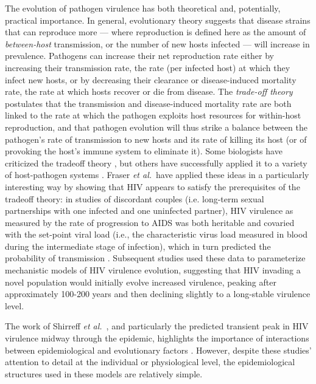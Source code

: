 \documentclass[10pt,letterpaper]{article}
\newcommand{\etal}{\textit{et al.}}
\begin{document}
The evolution of pathogen virulence has both 
theoretical and, potentially, practical
importance. In general, evolutionary theory suggests that
disease strains that can reproduce more --- where reproduction
is defined here as the amount of \emph{between-host} transmission, or
the number of new hosts infected --- will increase in prevalence.
Pathogens can increase their net reproduction rate either
by increasing their transmission rate, 
the rate (per infected host) at which they
infect new hosts, or by decreasing their clearance or disease-induced
mortality rate, the rate
at which hosts recover or die from disease.
The \emph{trade-off theory} \cite{alizon_virulence_2009} postulates that
the transmission and disease-induced mortality rate are both linked to the rate at which
the pathogen exploits host resources for within-host reproduction, 
and that pathogen
evolution will thus strike a balance between the
pathogen's rate of transmission
to new hosts and its rate of killing its host (or of provoking
the host's immune system to eliminate it).
Some biologists have criticized the tradeoff theory
\cite{EbertBull2003,alizon_adaptive_2015}, but others have
successfully applied it to a variety of host-pathogen systems \cite{Dwyer+1990,mackinnon1999genetic,jensen2006empirical,deroode2008virulence}.
Fraser \etal\ have applied these ideas in a particularly
interesting way 
by showing that HIV appears to satisfy the prerequisites of
the tradeoff theory: in studies of discordant couples (i.e. long-term
sexual partnerships with one infected and one uninfected partner), HIV
virulence as measured by the rate of progression to AIDS was both
heritable and covaried with the set-point viral load (i.e., the
characteristic virus load measured in blood during the intermediate
stage of infection), which in turn predicted the probability of
transmission
\cite{Fraser+2007,fraser_virulence_2014}. Subsequent studies
\cite{shirreff_transmission_2011,herbeck_hiv_2014} used these data to
parameterize mechanistic models of HIV virulence evolution, suggesting
that HIV invading a novel population would initially evolve increased
virulence, peaking after approximately 100-200 years and then declining
slightly to a long-stable virulence level.

The work of Shirreff \etal\ \cite{shirreff_transmission_2011}, and particularly the predicted transient peak in HIV virulence midway through the epidemic,
highlights the importance of interactions between epidemiological and
evolutionary factors \cite{day_virulence_2004,alizon_price_2009}.
However, despite these studies' attention to detail at the individual
or physiological level, the epidemiological structures used in these
models are relatively simple.
\end{document}

